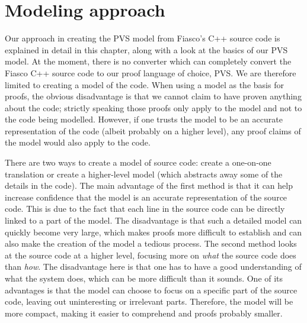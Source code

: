 \section{Modeling approach}
Our approach in creating the PVS model from Fiasco's C++ source code is explained in detail in this chapter, along with a look at the basics of our PVS model. At the moment, there is no converter which can completely convert the Fiasco C++ source code to our proof language of choice, PVS. We are therefore limited to creating a model of the code. When using a model as the basis for proofs, the obvious disadvantage is that we cannot claim to have proven anything about the code; strictly speaking those proofs only apply to the model and not to the code being modelled. However, if one trusts the model to be an accurate representation of the code (albeit probably on a higher level), any proof claims of the model would also apply to the code. \emptyline

There are two ways to create a model of source code: create a one-on-one translation or create a higher-level model (which abstracts away some of the details in the code). The main advantage of the first method is that it can help increase confidence that the model is an accurate representation of the source code. This is due to the fact that each line in the source code can be directly linked to a part of the model. The disadvantage is that such a detailed model can quickly become very large, which makes proofs more difficult to establish and can also make the creation of the model a tedious process. The second method looks at the source code at a higher level, focusing more on \textit{what} the source code does than \textit{how}. The disadvantage here is that one has to have a good understanding of what the system does, which can be more difficult than it sounds. One of its advantages is that the model can choose to focus on a specific part of the source code, leaving out uninteresting or irrelevant parts. Therefore, the model will be more compact, making it easier to comprehend and proofs probably smaller.